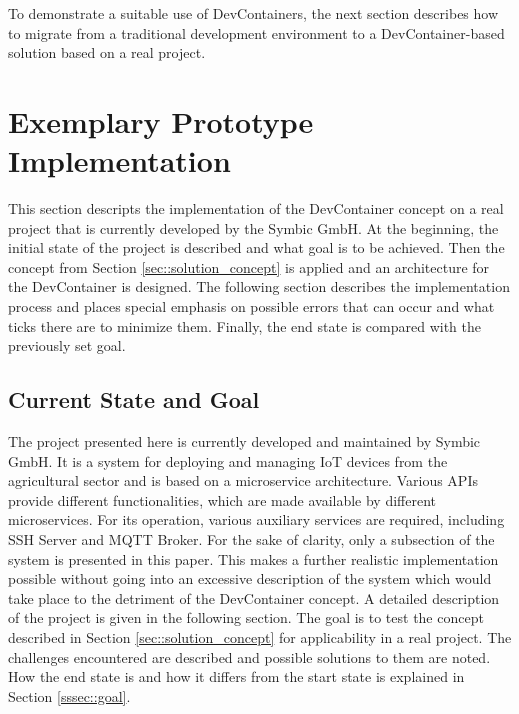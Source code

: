 \documentclass[12pt, a4paper]{article}
\begin{document}
    To demonstrate a suitable use of DevContainers, the next section describes how to migrate from a traditional development environment to a DevContainer-based solution based on a real project.

\section{Exemplary Prototype Implementation}\label{sec::solution_code}
This section descripts the implementation of the DevContainer concept on a real project that is currently developed by the Symbic GmbH. At the beginning, the initial state of the project is described and what goal is to be achieved. Then the concept from Section \ref{sec::solution_concept} is applied and an architecture for the DevContainer is designed. The following section describes the implementation process and places special emphasis on possible errors that can occur and what ticks there are to minimize them. Finally, the end state is compared with the previously set goal.

    \subsection{Current State and Goal}
    The project presented here is currently developed and maintained by Symbic GmbH. It is a system for deploying and managing \ac{IoT} devices from the agricultural sector and is based on a microservice architecture. Various \ac{API}s provide different functionalities, which are made available by different microservices. For its operation, various auxiliary services are required, including SSH Server and MQTT Broker. For the sake of clarity, only a subsection of the system is presented in this paper. This makes a further realistic implementation possible without going into an excessive description of the system which would take place to the detriment of the DevContainer concept. A detailed description of the project is given in the following section. \newline
    The goal is to test the concept described in Section \ref{sec::solution_concept} for applicability in a real project. The challenges encountered are described and possible solutions to them are noted. How the end state is and how it differs from the start state is explained in Section \ref{sssec::goal}.
    
\end{document}
